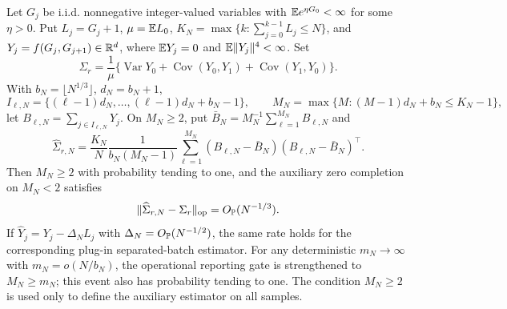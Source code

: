 \begin{lemma}\label{lem:paper-level-separated-covariance-main}
Let \(G_j\) be i.i.d. nonnegative integer-valued variables with
\(\mathbb{E} e^{\eta G_0}<\infty\) for some \(\eta>0\).  Put \(L_j=G_j+1\),
\(\mu=\mathbb{E} L_0\), \(K_N=\max\{k:\sum_{j=0}^{k-1}L_j\le N\}\), and
\(Y_j=f(G_j,G_{j+1})\in\mathbb{R}^d\), where \(\mathbb{E} Y_j=0\) and
\(\mathbb{E}\|Y_j\|^4<\infty\).  Set
\[
\Sigma_r=\frac{1}{\mu}\{\operatorname{Var}Y_0+\operatorname{Cov}(Y_0,Y_1)
+\operatorname{Cov}(Y_1,Y_0)\}.
\]
With \(b_N=\lfloor N^{1/3}\rfloor\), \(d_N=b_N+1\),
\[
I_{\ell,N}=\{(\ell-1)d_N,\ldots,(\ell-1)d_N+b_N-1\},
\qquad
M_N=\max\{M:(M-1)d_N+b_N\le K_N-1\},
\]
let \(B_{\ell,N}=\sum_{j\in I_{\ell,N}}Y_j\).  On \(M_N\ge2\), put
\(\bar B_N=M_N^{-1}\sum_{\ell=1}^{M_N}B_{\ell,N}\) and
\[
\widehat\Sigma_{r,N}
=\frac{K_N}{N}\frac{1}{b_N(M_N-1)}
\sum_{\ell=1}^{M_N}(B_{\ell,N}-\bar B_N)(B_{\ell,N}-\bar B_N)^\top .
\]
Then \(M_N\ge2\) with probability tending to one, and the auxiliary zero
completion on \(M_N<2\) satisfies
\[
\|\widehat\Sigma_{r,N}-\Sigma_r\|_{\operatorname{op}}=O_{\mathbb{P}}(N^{-1/3}).
\]
If \(\widehat Y_j=Y_j-\Delta_NL_j\) with
\(\Delta_N=O_{\mathbb{P}}(N^{-1/2})\), the same rate holds for the corresponding
plug-in separated-batch estimator.
For any deterministic \(m_N\to\infty\) with
\(m_N=o(N/b_N)\), the operational reporting gate is strengthened to
\(M_N\ge m_N\); this event also has probability tending to one.  The condition
\(M_N\ge2\) is used only to define the auxiliary estimator on all samples.


\end{lemma}
